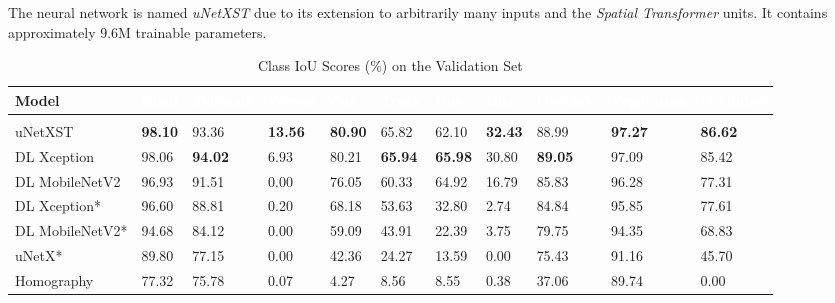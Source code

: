 \documentclass[a4paper, 10pt, conference]{ieeeconf}
\begin{document}
The neural network is named \textit{uNetXST} due to its extension to arbitrarily many inputs and the \textit{Spatial Transformer} units. It contains approximately 9.6M trainable parameters.

\setcounter{table}{1}
\begin{table*}[!b]
  \caption{Class IoU Scores (\%) on the Validation Set}
  \setlength{\tabcolsep}{2pt}
  \begin{center}
    \begin{tabu} to \textwidth{l X[c] X[c] X[c] X[c] X[c] X[c] X[c] X[c] X[c] X[c]}
      \textbf{Model} & \textcolor{white}{\textbf{Road}} & \textcolor{white}{\textbf{Sidewalk}} & \textcolor{white}{\textbf{Person}} & \textcolor{white}{\textbf{Car}} & \textcolor{white}{\textbf{Truck}} & \textcolor{white}{\textbf{Bus}} & \textcolor{white}{\textbf{Bike}} & \textcolor{white}{\textbf{Obstacle}} & \textcolor{white}{\textbf{Vegetation}} & \textcolor{white}{\textbf{Occluded}}\\
      \hline
      \\[-1em]
      uNetXST & \textbf{\num{98.10}} & \num{93.36} & \textbf{\num{13.56}} & \textbf{\num{80.90}} & \num{65.82} & \num{62.10} & \textbf{\num{32.43}} & \num{88.99} & \textbf{\num{97.27}} & \textbf{\num{86.62}}\\
      DL Xception & \num{98.06} & \textbf{\num{94.02}} & \num{6.93} & \num{80.21} & \textbf{\num{65.94}} & \textbf{\num{65.98}} & \num{30.80} & \textbf{\num{89.05}} & \num{97.09} & \num{85.42}\\
      DL MobileNetV2 & \num{96.93} & \num{91.51} & \num{0.00} & \num{76.05} & \num{60.33} & \num{64.92} & \num{16.79} & \num{85.83} & \num{96.28} & \num{77.31}\\
      DL Xception* & \num{96.60} & \num{88.81} & \num{0.20} & \num{68.18} & \num{53.63} & \num{32.80} & \num{2.74} & \num{84.84} & \num{95.85} & \num{77.61}\\
      DL MobileNetV2* & \num{94.68} & \num{84.12} & \num{0.00} & \num{59.09} & \num{43.91} & \num{22.39} & \num{3.75} & \num{79.75} & \num{94.35} & \num{68.83}\\
      uNetX* & \num{89.80} & \num{77.15} & \num{0.00} & \num{42.36} & \num{24.27} & \num{13.59} & \num{0.00} & \num{75.43} & \num{91.16} & \num{45.70}\\
      Homography & \num{77.32} & \num{75.78} & \num{0.07} & \num{4.27} & \num{8.56} & \num{8.55} & \num{0.38} & \num{37.06} & \num{89.74} & \num{0.00}\\
    \end{tabu}
  \end{center}
  \label{tab:IoU}
\end{table*}
\end{document}
